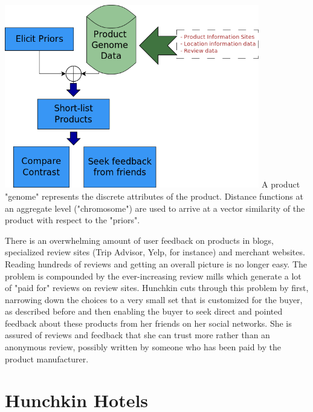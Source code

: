 \documentclass[DIV=calc, paper=a4, fontsize=11pt, twocolumn]{scrartcl}	 %
\begin{document}
\includegraphics[height=80mm]{hk-concept.png}
A product "genome" represents the discrete attributes of the product. Distance functions at an aggregate level ("chromosome") are used to arrive at a vector similarity of the product with respect to the "priors". 

\par
There is an overwhelming amount of user feedback on products in blogs, specialized review sites (Trip Advisor, Yelp, for instance) and merchant websites. Reading hundreds of reviews and getting an overall picture is no longer easy. The problem is compounded by the ever-increasing review mills which generate a lot of "paid for" reviews on review sites. Hunchkin cuts through this problem by first, narrowing down the choices to a very small set that is customized for the buyer, as described before and then enabling the buyer to seek direct and pointed feedback about these products from her friends on her social networks. She is assured of reviews and feedback that she can trust more rather than an anonymous review, possibly written by someone who has been paid by the product manufacturer.

\section*{Hunchkin Hotels}
\end{document}
